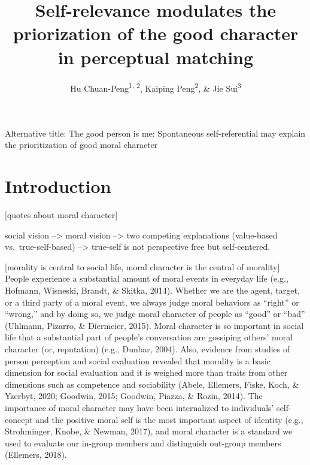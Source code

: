 \documentclass[
  english,
  man]{apa6}
\title{Self-relevance modulates the priorization of the good character in perceptual matching}
\author{Hu Chuan-Peng\textsuperscript{1, 2}, Kaiping Peng\textsuperscript{2}, \& Jie Sui\textsuperscript{3}}
\date{}
\affiliation{\vspace{0.5cm}\textsuperscript{1} Nanjing Normal University, 210024 Nanjing, China\\\textsuperscript{2} Tsinghua University, 100084 Beijing, China\\\textsuperscript{3} University of Aberdeen, Aberdeen, Scotland}
\begin{document}
\maketitle

Alternative title: The good person is me: Spontaneous self-referential may explain the prioritization of good moral character

\hypertarget{introduction}{%
\section{Introduction}\label{introduction}}

{[}quotes about moral character{]}

social vision --\textgreater{} moral vision --\textgreater{} two competing explanations (value-based vs.~true-self-based) --\textgreater{} true-self is not perspective free but self-centered.

{[}morality is central to social life, moral character is the central of morality{]}
People experience a substantial amount of moral events in everyday life (e.g., Hofmann, Wisneski, Brandt, \& Skitka, 2014). Whether we are the agent, target, or a third party of a moral event, we always judge moral behaviors as ``right'' or ``wrong,'' and by doing so, we judge moral character of people as ``good'' or ``bad'' (Uhlmann, Pizarro, \& Diermeier, 2015). Moral character is so important in social life that a substantial part of people's conversation are gossiping others' moral character (or, reputation) (e.g., Dunbar, 2004). Also, evidence from studies of person perception and social evaluation revealed that morality is a basic dimension for social evaluation and it is weighed more than traits from other dimensions such as competence and sociability (Abele, Ellemers, Fiske, Koch, \& Yzerbyt, 2020; Goodwin, 2015; Goodwin, Piazza, \& Rozin, 2014). The importance of moral character may have been internalized to individuals' self-concept and the positive moral self is the most important aspect of identity (e.g., Strohminger, Knobe, \& Newman, 2017), and moral character is a standard we used to evaluate our in-group members and distinguish out-group members (Ellemers, 2018).
\end{document}
